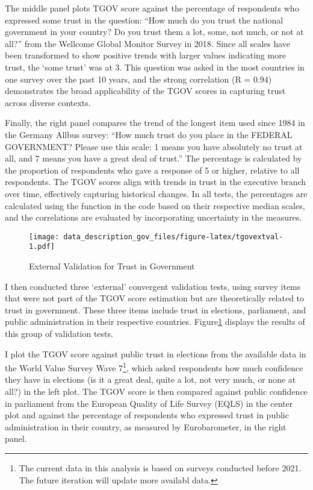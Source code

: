 \documentclass[
  12pt,
]{article}
\begin{document}
The middle panel plots TGOV score against the percentage of respondents who expressed some trust in the question: ``How much do you trust the national government in your country? Do you trust them a lot, some, not much, or not at all?'' from the Wellcome Global Monitor Survey in 2018.
Since all scales have been transformed to show positive trends with larger values indicating more trust, the `some trust' was at 3.
This question was asked in the most countries in one survey over the past 10 years, and the strong correlation (R = 0.94) demonstrates the broad applicability of the TGOV scores in capturing trust across diverse contexts.

Finally, the right panel compares the trend of the longest item used since 1984 in the Germany Allbus survey: ``How much trust do you place in the FEDERAL GOVERNMENT? Please use this scale: 1 means you have absolutely no trust at all, and 7 means you have a great deal of trust.''
The percentage is calculated by the proportion of respondents who gave a response of 5 or higher, relative to all respondents.
The TGOV scores align with trends in trust in the executive branch over time, effectively capturing historical changes.
In all tests, the percentages are calculated using the function in the code based on their respective median scales, and the correlations are evaluated by incorporating uncertainty in the measures.

\begin{figure}
\centering
\texttt{[image: data\_description\_gov\_files/figure-latex/tgovextval-1.pdf]}
\caption{\label{fig:tgovextval}External Validation for Trust in Government \label{tgov_ev1}}
\end{figure}

I then conducted three `external' convergent validation tests, using survey items that were not part of the TGOV score estimation but are theoretically related to trust in government.
These three items include trust in elections, parliament, and public administration in their respective countries.
Figure\nobreakspace{}\ref{tgov_ev1} displays the results of this group of validation tests.

I plot the TGOV score against public trust in elections from the available data in the World Value Survey Wave 7\footnote{The current data in this analysis is based on surveys conducted before 2021. The future iteration will update more availabl data.}, which asked respondents how much confidence they have in elections (is it a great deal, quite a lot, not very much, or none at all?) in the left plot.
The TGOV score is then compared against public confidence in parliament from the European Quality of Life Survey (EQLS) in the center plot and against the percentage of respondents who expressed trust in public administration in their country, as measured by Eurobarometer, in the right panel.
\end{document}
